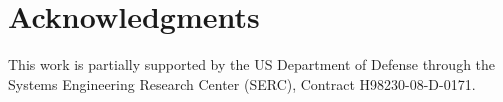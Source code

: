 \documentclass{sig-alternate-05-2015}
\begin{document}






\section{Acknowledgments}

This work is partially supported by the US Department of Defense through the
Systems Engineering Research Center (SERC), Contract H98230-08-D-0171.


%
%


\end{document}

